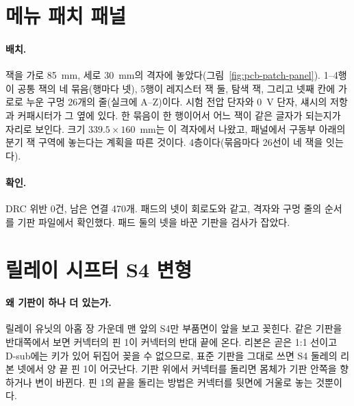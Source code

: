 
\section{메뉴 패치 패널}\label{pcb:patch-panel}

\paragraph{배치.} 잭을 가로 85~mm, 세로 30~mm의 격자에 놓았다(그림~\ref{fig:pcb-patch-panel}). 1--4행이 공통 잭의 네
묶음(행마다 넷), 5행이 레지스터 잭 둘, 탐색 잭, 그리고 넷째 칸에 가로로 누운 구멍 26개의 줄(실크에 A--Z)이다. 시험
전압 단자와 0~V 단자, 섀시의 저항과 커패시터가 그 옆에 있다. 한 묶음이 한 행이어서 어느 잭이 같은 글자가 되는지가
자리로 보인다. 크기 $339.5 \times 160$~mm는 이 격자에서 나왔고, 패널에서 구동부 아래의 분기 잭 구역에 놓는다는
계획을 따른 것이다. 4층이다(묶음마다 26선이 네 잭을 잇는다).

\paragraph{확인.} DRC 위반 0건, 남은 연결 470개. 패드의 넷이 회로도와 같고, 격자와 구멍 줄의 순서를 기판 파일에서
확인했다. 패드 둘의 넷을 바꾼 기판을 검사가 잡았다.


\section{릴레이 시프터 S4 변형}\label{pcb:shifter-s4}

\paragraph{왜 기판이 하나 더 있는가.} 릴레이 유닛의 아홉 장 가운데 맨 앞의 S4만 부품면이 앞을 보고 꽂힌다. 같은
기판을 반대쪽에서 보면 커넥터의 핀 1이 커넥터의 반대 끝에 온다. 리본은 곧은 1:1 선이고 D-sub에는 키가 있어 뒤집어
꽂을 수 없으므로, 표준 기판을 그대로 쓰면 S4 둘레의 리본 넷에서 양 끝 핀 1이 어긋난다. 기판 위에서 커넥터를
돌리면 몸체가 기판 안쪽을 향하거나 변이 바뀐다. 핀 1의 끝을 돌리는 방법은 커넥터를 뒷면에 거울로 놓는 것뿐이다.

